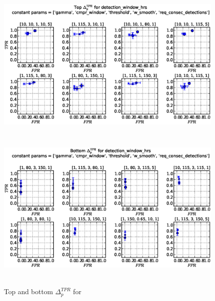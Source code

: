 \begin{figure}[!h]
\begin{center}
\includegraphics[height=3in]{../fig/final/top_tpr/detection_window_hrs}
\includegraphics[height=3in]{../fig/final/bottom_tpr/detection_window_hrs}
\end{center}
\caption{\label{fig:delta_top_bottom5t} Top and bottom $\Delta_p^{TPR}$ for }
\end{figure}

